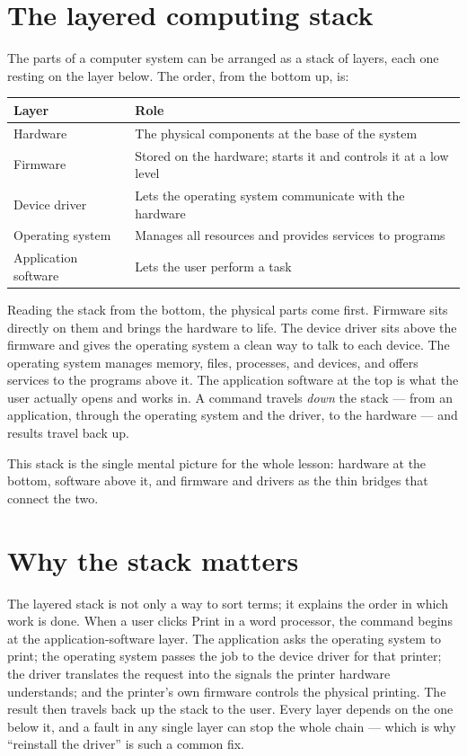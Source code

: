 \documentclass[11pt]{article}
\begin{document}
\section{The layered computing stack}
The parts of a computer system can be arranged as a stack of layers, each one
resting on the layer below. The order, from the bottom up, is:

\begin{center}
\begin{tabular}{p{}p{}}
\toprule
\textbf{Layer} & \textbf{Role} \\
\midrule
Hardware & The physical components at the base of the system \\
Firmware & Stored on the hardware; starts it and controls it at a low level \\
Device driver & Lets the operating system communicate with the hardware \\
Operating system & Manages all resources and provides services to programs \\
Application software & Lets the user perform a task \\
\bottomrule
\end{tabular}
\end{center}

Reading the stack from the bottom, the physical parts come first. Firmware sits
directly on them and brings the hardware to life. The device driver sits above
the firmware and gives the operating system a clean way to talk to each device.
The operating system manages memory, files, processes, and devices, and offers
services to the programs above it. The application software at the top is what
the user actually opens and works in. A command travels \emph{down} the stack
--- from an application, through the operating system and the driver, to the
hardware --- and results travel back up.

This stack is the single mental picture for the whole lesson: hardware at the
bottom, software above it, and firmware and drivers as the thin bridges that
connect the two.

\section{Why the stack matters}
The layered stack is not only a way to sort terms; it explains the order in
which work is done. When a user clicks Print in a word processor, the command
begins at the application-software layer. The application asks the operating
system to print; the operating system passes the job to the device driver for
that printer; the driver translates the request into the signals the printer
hardware understands; and the printer's own firmware controls the physical
printing. The result then travels back up the stack to the user. Every layer
depends on the one below it, and a fault in any single layer can stop the
whole chain --- which is why ``reinstall the driver'' is such a common fix.
\end{document}

